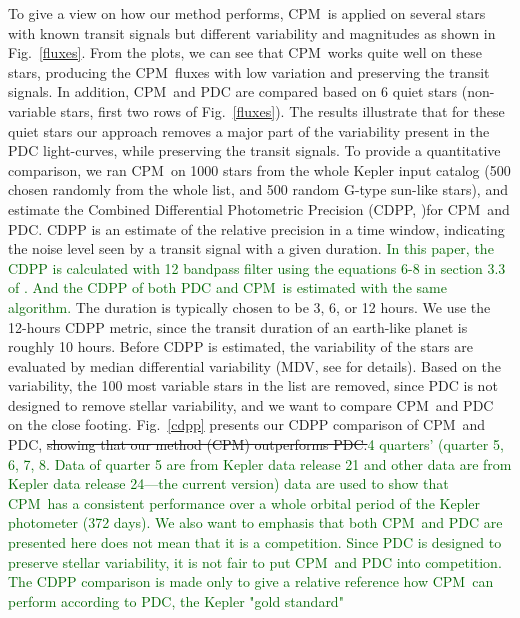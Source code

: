 \documentclass[12pt, preprint]{aastex}
\newcommand{\name}{CPM}
\newcommand{\revise}[1]{\textcolor{darkgreen}{#1}}
\newcommand{\remove}[1]{\sout{#1}}
\begin{document}
To give a view on how our method performs, \name\ is applied on several stars with 
known transit signals but different variability and magnitudes as shown in Fig.~\ref{fluxes}. 
From the plots, we can see that \name\ works quite well on these stars, producing the \name\ fluxes 
with low variation and preserving the transit signals.
In addition, \name\ and PDC are compared based on 6 quiet stars 
(non-variable stars, first two rows of Fig.~\ref{fluxes}). 
The results illustrate that for these quiet stars our approach removes 
a major part of the variability present in the PDC light-curves, while preserving the transit signals. 
To provide a quantitative comparison, we ran \name\ on 1000 stars from the whole Kepler input catalog 
(500 chosen randomly from the whole list, and 500 random G-type sun-like stars), 
and estimate the Combined Differential Photometric Precision (CDPP,  \cite{cdpp1} )for \name\ and PDC.  
CDPP is an estimate of the relative precision in a time window, 
indicating the noise level seen by a transit signal with a given duration. 
\revise{In this paper, the CDPP is calculated with 12 bandpass filter using the equations 6-8 in section 3.3 of \citep{cdpp1}. And the CDPP of both PDC and \name\ is estimated with the same algorithm.} 
The duration is typically chosen to be 3, 6, or 12 hours. 
We use the 12-hours CDPP metric, since the transit duration of an earth-like planet is roughly 10 hours. 
Before CDPP is estimated, the variability of the stars are evaluated by median differential variability 
  (MDV, see \cite{basri2013} for details). 
Based on the variability, the 100 most variable stars in the list are removed, 
  since PDC is not designed to remove stellar variability, 
  and we want to compare \name\ and PDC on the close footing.
Fig.~\ref{cdpp} presents our CDPP comparison of \name\ and PDC, 
  \remove{showing that our method (\name) outperforms PDC.}\revise{4 quarters' (quarter 5, 6, 7, 8. Data of quarter 5 are from Kepler data release 21 and other data are from Kepler data release 24---the current version) data are used to show that \name\ has a consistent performance over a whole orbital period of the Kepler photometer (372 days). We also want to emphasis that both \name\ and PDC are presented here does not mean that it is a competition. Since PDC is designed to preserve stellar variability, it is not fair to put \name\ and PDC into competition. The CDPP comparison is made only to give a relative reference how \name\ can perform according to PDC, the Kepler "gold standard"}
\end{document}
